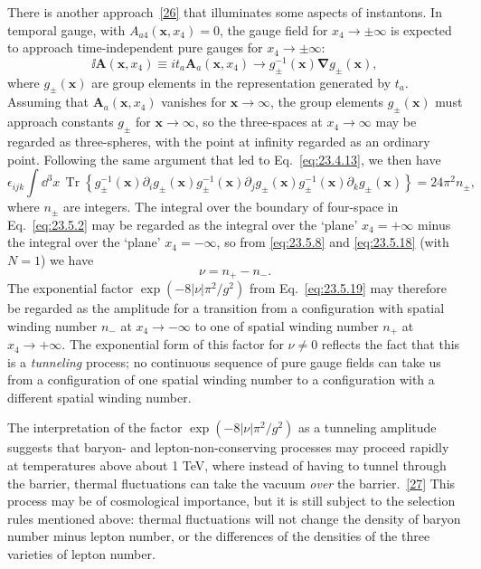 There is another approach~\hyperref[ch23-ref-26]{[26]} that illuminates
some aspects of instantons. In temporal gauge, with
$A_{a4}(\mathbf x,x_4)=0$, the gauge field for
$x_4\to\pm\infty$ is expected to approach time-independent pure gauges
for $x_4\to\pm\infty$:
\begin{equation}
\ii\mathbf A(\mathbf x,x_4)\equiv
it_a\mathbf A_a(\mathbf x,x_4)
\longrightarrow
g_\pm^{-1}(\mathbf x)\boldsymbol{\nabla}g_\pm(\mathbf x),
\tag{23.5.24}\label{eq:23.5.24}
\end{equation}
where $g_\pm(\mathbf x)$ are group elements in the representation
generated by $t_a$. Assuming that
$\mathbf A_a(\mathbf x,x_4)$ vanishes for $\mathbf x\to\infty$, the
group elements $g_\pm(\mathbf x)$ must approach constants $g_\pm$ for
$\mathbf x\to\infty$, so the three-spaces at $x_4\to\infty$ may be
regarded as three-spheres, with the point at infinity regarded as an
ordinary point. Following the same argument that led to
Eq.~\eqref{eq:23.4.13}, we then have
\begin{equation}
\epsilon_{ijk}\int \dd^3x\,
\operatorname{Tr}\left\{
g_\pm^{-1}(\mathbf x)\partial_i g_\pm(\mathbf x)
g_\pm^{-1}(\mathbf x)\partial_j g_\pm(\mathbf x)
g_\pm^{-1}(\mathbf x)\partial_k g_\pm(\mathbf x)
\right\}
=24\pi^2n_\pm,
\tag{23.5.25}\label{eq:23.5.25}
\end{equation}
where $n_\pm$ are integers. The integral over the boundary of four-space
in Eq.~\eqref{eq:23.5.2} may be regarded as the integral over the `plane'
$x_4=+\infty$ minus the integral over the `plane' $x_4=-\infty$, so from
\eqref{eq:23.5.8} and \eqref{eq:23.5.18} (with $N=1$) we have
\begin{equation}
\nu=n_+-n_-.
\tag{23.5.26}\label{eq:23.5.26}
\end{equation}
The exponential factor $\exp(-8|\nu|\pi^2/g^2)$ from
Eq.~\eqref{eq:23.5.19} may therefore be regarded as the amplitude for a
transition from a configuration with spatial winding number $n_-$ at
$x_4\to-\infty$ to one of spatial winding number $n_+$ at
$x_4\to+\infty$. The exponential form of this factor for $\nu\ne0$
reflects the fact that this is a \emph{tunneling} process; no continuous
sequence of pure gauge fields can take us from a configuration of one
spatial winding number to a configuration with a different spatial
winding number.

The interpretation of the factor $\exp(-8|\nu|\pi^2/g^2)$ as a tunneling
amplitude suggests that baryon- and lepton-non-conserving processes may
proceed rapidly at temperatures above about 1 TeV, where instead of
having to tunnel through the barrier, thermal fluctuations can take the
vacuum \emph{over} the barrier.~\hyperref[ch23-ref-27]{[27]} This process
may be of cosmological importance, but it is still subject to the
selection rules mentioned above: thermal fluctuations will not change
the density of baryon number minus lepton number, or the differences of
the densities of the three varieties of lepton number.

